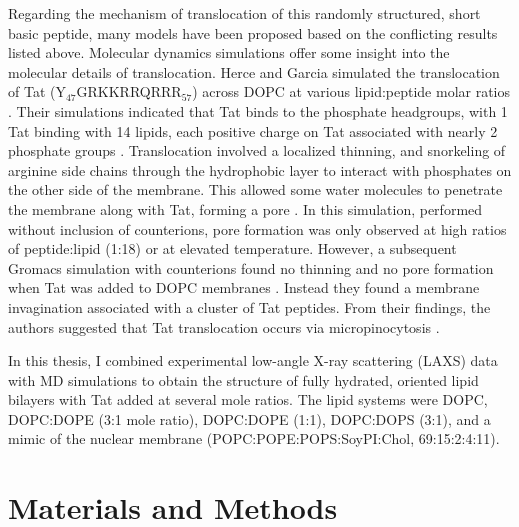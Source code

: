 Regarding the mechanism of translocation of this randomly structured, short 
basic peptide, many models have been proposed based on the conflicting results 
listed above. Molecular dynamics simulations offer some insight into the 
molecular details of translocation. Herce and Garcia simulated the 
translocation of Tat (Y$_{47}$GRKKRRQRRR$_{57}$) across DOPC at various 
lipid:peptide molar ratios \cite{Herce07}. Their simulations indicated that Tat 
binds to the phosphate headgroups, with 1 Tat binding with 14 lipids, each 
positive charge on Tat associated with nearly 2 phosphate groups \cite{Herce07}. 
Translocation involved a localized thinning, and snorkeling of arginine side 
chains through the hydrophobic layer to interact with phosphates on
the other side of the membrane. This allowed some water molecules to penetrate 
the membrane along with Tat, forming a pore \cite{Herce07}. In this simulation, 
performed without inclusion of counterions, pore formation was only observed at 
high ratios of peptide:lipid (1:18) or at elevated temperature. However, a 
subsequent Gromacs simulation with counterions found no thinning and no pore 
formation when Tat was added to DOPC membranes \cite{Yesylevskyy09}. Instead they 
found a membrane invagination associated with a cluster of Tat peptides. From 
their findings, the authors suggested that
Tat translocation occurs via micropinocytosis \cite{Yesylevskyy09}. 

In this thesis, I combined experimental low-angle X-ray scattering (LAXS) 
data with MD simulations to obtain the structure of fully hydrated, oriented 
lipid bilayers with Tat added at several mole ratios. The lipid systems 
were DOPC, DOPC:DOPE (3:1 mole ratio), DOPC:DOPE (1:1), DOPC:DOPS (3:1), and a 
mimic of the nuclear membrane (POPC:POPE:POPS:SoyPI:Chol, 69:15:2:4:11). 

\section{Materials and Methods}
